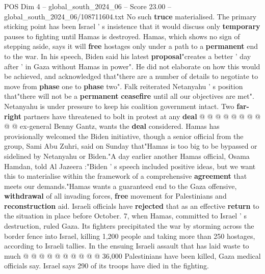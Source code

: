 \begin{textsample}{POS Dim 4 – global\_south\_2024\_06 – Score 23.00 – global\_south\_2024\_06/108711604.txt}
No such \textbf{truce} materialised.
The primary sticking point has been Israel ' s insistence that it would discuss only \textbf{temporary} pauses to fighting until Hamas is destroyed.
Hamas, which shows no sign of stepping aside, says it will \textbf{free} hostages only under a path to a \textbf{permanent} end to the war.
In his speech, Biden said his latest \textbf{proposal}"creates a better ' day after ' in Gaza without Hamas in power".
He did not elaborate on how this would be achieved, and acknowledged that"there are a number of details to negotiate to move from \textbf{phase} one to \textbf{phase} two".
Falk reiterated Netanyahu ' s position that"there will not be a \textbf{permanent} \textbf{ceasefire} until all our objectives are met".
Netanyahu is under pressure to keep his coalition government intact.
Two \textbf{far-right} partners have threatened to bolt in protest at any \textbf{deal} @ @ @ @ @ @ @ @ @ @ ex-general Benny Gantz, wants the \textbf{deal} considered.
Hamas has provisionally welcomed the Biden initiative, though a senior official from the group, Sami Abu Zuhri, said on Sunday that"Hamas is too big to be bypassed or sidelined by Netanyahu or Biden."A day earlier another Hamas official, Osama Hamdan, told Al Jazeera :"Biden ' s speech included positive ideas, but we want this to materialise within the framework of a comprehensive \textbf{agreement} that meets our demands."Hamas wants a guaranteed end to the Gaza offensive, \textbf{withdrawal} of all invading forces, \textbf{free} movement for Palestinians and \textbf{reconstruction} aid.
Israeli officials have \textbf{rejected} that as an effective \textbf{return} to the situation in place before October. 7, when Hamas, committed to Israel ' s destruction, ruled Gaza.
Its fighters precipitated the war by storming across the border fence into Israel, killing 1,200 people and taking more than 250 hostages, according to Israeli tallies.
In the ensuing Israeli assault that has laid waste to much @ @ @ @ @ @ @ @ @ @ 36,000 Palestinians have been killed, Gaza medical officials say.
Israel says 290 of its troops have died in the fighting.

\end{textsample}
